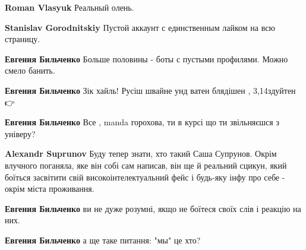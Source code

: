 \begin{itemize}
\begin{itemize}
\textbf{Roman Vlasyuk} Реальный олень.

 
\textbf{Stanislav Gorodnitskiy} Пустой аккаунт с единственным лайком на всю страницу.

 
\textbf{Евгения Бильченко} Больше половины - боты с пустыми профилями. Можно смело банить.

 
\textbf{Евгения Бильченко} Зік хайль!
Русіш швайне унд ватен блядішен , 3,14здуйтен 🚆👉🇷🇺

 
\textbf{Евгения Бильченко} Все , manda горохова, ти в курсі що ти звільняєшся з універу?

 
\textbf{Alexandr Suprunov} Буду тепер знати, хто такий Саша Супрунов. Окрім влучного поганяла, яке він собі сам написав, він ще й реальний сцикун, який боїться засвітити свій високоінтелектуальний фейс і будь-яку інфу про себе - окрім міста проживання.

 
\textbf{Евгения Бильченко} ви не дуже розумні, якщо не боїтеся своїх слів і реакцію на них.

 
\textbf{Евгения Бильченко} а ще таке питання: "мы" це хто?

 

\end{itemize}
\end{itemize}
